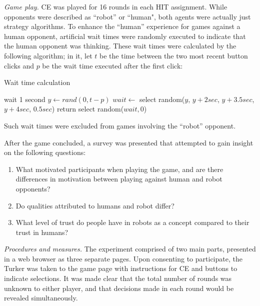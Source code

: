 \documentclass{sig-alternate}
\begin{document}
\textit{Game play. } CE was played for 16 rounds in each HIT assignment. While opponents were described as ``robot'' or ``human", both agents were actually just strategy algorithms. To enhance the ``human'' experience for games against a human opponent, artificial wait times were randomly executed to indicate that the human opponent was thinking. These wait times were calculated by the following algorithm; in it, let $t$ be the time between the two most recent button clicks and $p$ be the wait time executed after the first click:

\begin{algorithm}
\caption{Wait time calculation}
\begin{algorithmic}
\STATE wait 1 second
\ELSE
\STATE $y \leftarrow rand(0, t-p)$
\STATE $wait \leftarrow$ select random($y$, $y+2 sec$, $y+3.5 sec$, $y+4 sec$, $0.5 sec$)
\STATE return select random($wait, 0$)
\ENDIF
\end{algorithmic}
\end{algorithm}

Such wait times were excluded from games involving the ``robot'' opponent.

After the game concluded, a survey was presented that attempted to gain insight on the following questions:

\begin{enumerate}
\item What motivated participants when playing the game, and are there differences in motivation between playing against human and robot opponents? 
\item Do qualities attributed to humans and robot differ? \cite{arras2000we}
\item What level of trust do people have in robots as a concept compared to their trust in humans? \cite{jian2000foundations}
\end{enumerate}

\textit{Procedures and measures. } The experiment comprised of two main parts, presented in a web browser as three separate pages. Upon consenting to participate, the Turker was taken to the game page with instructions for CE and buttons to indicate selections. It was made clear that the total number of rounds was unknown to either player, and that decisions made in each round would be revealed simultaneously. 
\end{document}
